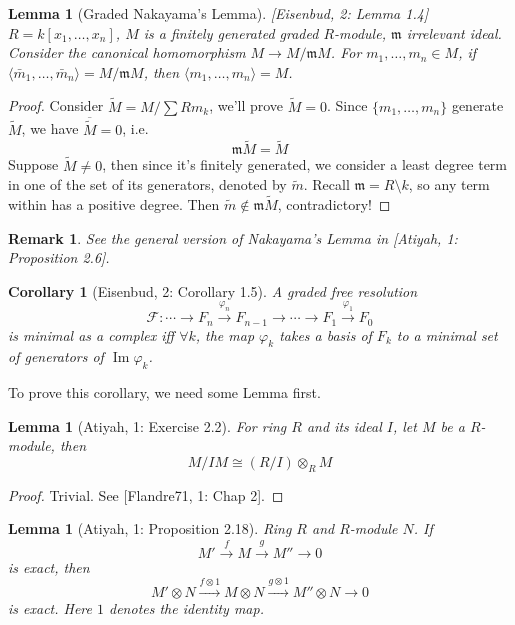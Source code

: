 \documentclass[11pt]{article}
\DeclareMathOperator{\ImOp}{Im} %
\newtheorem{lemma}[theorem]{Lemma}
\newtheorem{corollary}[theorem]{Corollary}
\newtheorem{remark}[theorem]{Remark}
\begin{document}
\begin{lemma}[Graded Nakayama's Lemma] [Eisenbud, 2: Lemma 1.4]
    $R = k[x_1, \dots, x_n]$, $M$ is a finitely generated graded $R$-module, $\mathfrak{m}$ irrelevant ideal. Consider the canonical homomorphism $M \to M/\mathfrak{m}M$.
    For $m_1, \dots, m_n \in M$, if $\langle \bar{m}_1, \dots, \bar{m}_n \rangle = M/\mathfrak{m}M$, then $\langle m_1, \dots, m_n \rangle = M$.
\end{lemma}
\begin{proof}
    Consider $\tilde{M} = M / \sum R m_k$, we'll prove $\tilde{M} = 0$.
    Since $\{m_1, \dots, m_n\}$ generate $\tilde{M}$, we have $\overline{\tilde{M}} = 0$, i.e.
    $$ \mathfrak{m}\tilde{M} = \tilde{M} $$
    Suppose $\tilde{M} \ne 0$, then since it's finitely generated, we consider a least degree term in one of the set of its generators, denoted by $\tilde{m}$.
    Recall $\mathfrak{m} = R \setminus k$, so any term within has a positive degree.
    Then $\tilde{m} \notin \mathfrak{m}\tilde{M}$, contradictory!
\end{proof}

\begin{remark}
    See the general version of Nakayama's Lemma in [Atiyah, 1: Proposition 2.6].
\end{remark}

\begin{corollary}[Eisenbud, 2: Corollary 1.5]
    A graded free resolution
    $$ \mathcal{F}: \cdots \to F_n \xrightarrow{\varphi_n} F_{n-1} \to \cdots \to F_1 \xrightarrow{\varphi_1} F_0 $$
    is minimal as a complex iff $\forall k$, the map $\varphi_k$ takes a basis of $F_k$ to a minimal set of generators of $\ImOp \varphi_k$.
\end{corollary}

To prove this corollary, we need some Lemma first.

\begin{lemma}[Atiyah, 1: Exercise 2.2]
    For ring $R$ and its ideal $I$, let $M$ be a $R$-module, then
    $$ M/IM \cong (R/I) \otimes_R M $$
\end{lemma}
\begin{proof}
    Trivial. See [Flandre71, 1: Chap 2].
\end{proof}

\begin{lemma}[Atiyah, 1: Proposition 2.18]
    Ring $R$ and $R$-module $N$. If
    $$ M' \xrightarrow{f} M \xrightarrow{g} M'' \to 0 $$
    is exact, then
    $$ M' \otimes N \xrightarrow{f \otimes 1} M \otimes N \xrightarrow{g \otimes 1} M'' \otimes N \to 0 $$
    is exact. Here $1$ denotes the identity map.
\end{lemma}
\end{document}
